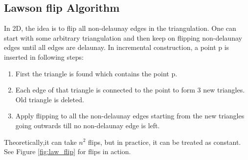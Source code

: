 \subsection{Lawson flip Algorithm}
In 2D, the idea is to flip all non-delaunay edges in the triangulation. One can start with some arbitrary triangulation and then keep on flipping non-delaunay edges until all edges are delaunay. In incremental construction, a point p is inserted in following steps:
\begin{enumerate}
	\item First the triangle is found which contains the point p.
	\item Each edge of that triangle is connected to the point to form 3 new triangles. Old triangle is deleted.
	\item Apply flipping to all the non-delaunay edges starting from the new triangles going outwards till no non-delaunay edge is left.
\end{enumerate}

Theoretically,it can take $n^2$ flips, but in practice, it can be treated as constant. See Figure \ref{fig:law_flip} for flips in action.

